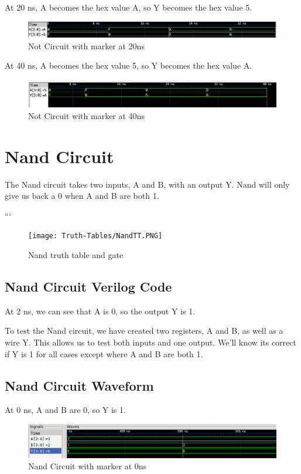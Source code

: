 \documentclass[12pt]{article}
\begin{document}
At 20 ns, A becomes the hex value A, so Y becomes the hex value 5.
\begin{figure}[H]
    \centering
    \includegraphics[width = 1.0\textwidth]{Step2/Not/Not-20ns.png}
    \caption{Not Circuit with marker at 20ns}
    \label{fig:enter-label}
\end{figure}

At 40 ns, A becomes the hex value 5, so Y becomes the hex value A.
\begin{figure}[H]
    \centering
    \includegraphics[width = 1.0\textwidth]{Step2/Not/Not-40ns.png}
    \caption{Not Circuit with marker at 40ns}
    \label{fig:enter-label}
\end{figure}

\section{Nand Circuit}
The Nand circuit takes two inputs, A and B, with an output Y. Nand will only give us back a 0 when A and B are both 1.

```\begin{figure}[H]
    \centering
    \texttt{[image: Truth-Tables/NandTT.PNG]}
    \caption{Nand truth table and gate}
    \label{fig:shift-table}
\end{figure}

\subsection{Nand Circuit Verilog Code}
At 2 ns, we can see that  A is 0, so the output Y is 1.


To test the Nand circuit, we have created two registers, A and B, as well as a wire Y. This allows us to test both inputs and one output. We'll know its correct if Y is 1 for all cases except where A and B are both 1.

\subsection{Nand Circuit Waveform}

At 0 ns, A and B are 0, so Y is 1.
\begin{figure}[H]
    \centering
    \includegraphics[width = 1.0\textwidth]{nand/nand_wave1.PNG}
    \caption{Nand Circuit with marker at 0ns}
    \label{fig:enter-label}
\end{figure}
\end{document}
